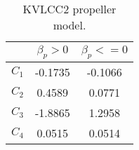 \begin{table}[h]
    \centering
        \caption{KVLCC2 propeller model.}
    \label{\detokenize{06.20_results_kvlcc2:kvlcc2-propeller-model}}
    \begin{tabular}{|c|c|c|}
\hline
\sphinxstyletheadfamily &\sphinxstyletheadfamily 

\(\beta_p>0\)
&\sphinxstyletheadfamily 

\(\beta_p<=0\)
\\
\hline

\(C_1\)
&

-0.1735
&

-0.1066
\\


\(C_2\)
&

0.4589
&

0.0771
\\


\(C_3\)
&

-1.8865
&

1.2958
\\


\(C_4\)
&

0.0515
&

0.0514
\\
\hline
\end{tabular}

\end{table}

